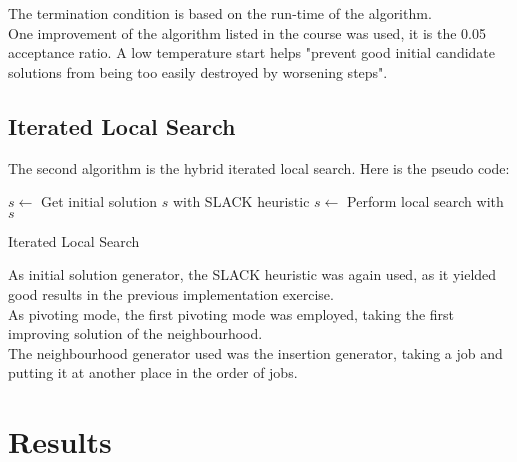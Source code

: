 The termination condition is based on the run-time of the algorithm.\\

One improvement of the algorithm listed in the course was used, it is the 0.05 acceptance ratio. A low temperature start helps "prevent good initial candidate solutions from being too easily destroyed by worsening steps".

\subsection{Iterated Local Search}

The second algorithm is the hybrid iterated local search. Here is the pseudo code:

\begin{algorithm}[H]
 $s \leftarrow$ Get initial solution $s$ with SLACK heuristic\;
 $s \leftarrow$ Perform local search with $s$\;
 \caption{Iterated Local Search}
\end{algorithm}

As initial solution generator, the SLACK heuristic was again used, as it yielded good results in the previous implementation exercise.\\

As pivoting mode, the first pivoting mode was employed, taking the first improving solution of the neighbourhood.\\

The neighbourhood generator used was the insertion generator, taking a job and putting it at another place in the order of jobs.\\

\section{Results}

